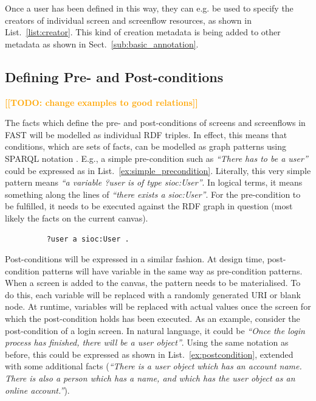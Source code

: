 \documentclass[twoside]{fast_latex}
\newcommand{\todo}[1]{\textsf{\textbf{\textcolor{Orange}{[[TODO: #1]]}}}}
\newcommand{\todo}[1]{}
\begin{document}
Once a user has been defined in this way, they can e.g. be used to specify the creators of individual screen and screenflow resources, as shown in List.~\ref{list:creator}. This kind of creation metadata is being added to other metadata as shown in Sect.~\ref{sub:basic_annotation}.

\singlespacing
{}
\begin{figure}[ht]
	
\end{figure}
\doublespacing



\subsection{Defining Pre- and Post-conditions} %
\label{sub:defining_pre_and_post_conditions}

\todo{change examples to good relations}

The facts which define the pre- and post-conditions of screens and screenflows in FAST will be modelled as individual RDF triples. In effect, this means that conditions, which are sets of facts, can be modelled as graph patterns using SPARQL notation \cite{sparql2008spec}. E.g., a simple pre-condition such as \emph{``There has to be a user''} could be expressed as in List.~\ref{ex:simple_precondition}. Literally, this very simple pattern means \emph{``a variable ?user is of type sioc:User''}. In logical terms, it means something along the lines of \emph{``there exists a sioc:User''}. For the pre-condition to be fulfilled, it needs to be executed against the RDF graph in question (most likely the facts on the current canvas).

\singlespacing
{}
\begin{figure}[ht]
\begin{lstlisting}
	?user a sioc:User .
\end{lstlisting}
\end{figure}
\doublespacing

Post-conditions will be expressed in a similar fashion. At design time, post-condition patterns will have variable in the same way as pre-condition patterns. When a screen is added to the canvas, the pattern needs to be materialised. To do this, each variable will be replaced with a randomly generated URI or blank node. At runtime, variables will be replaced with actual values once the screen for which the post-condition holds has been executed. As an example, consider the post-condition of a login screen. In natural language, it could be \emph{``Once the login process has finished, there will be a user object''}. Using the same notation as before, this could be expressed as shown in List.~\ref{ex:postcondition}, extended with some additional facts (\emph{``There is a user object which has an account name. There is also a person which has a name, and which has the user object as an online account.''}).
\end{document}
